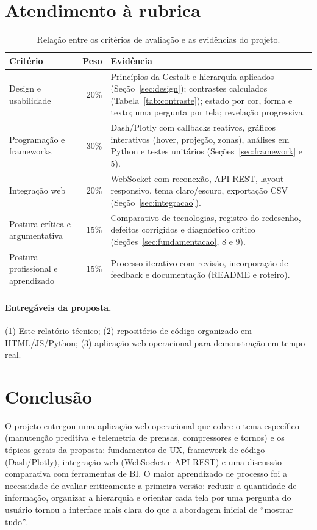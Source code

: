 \documentclass[12pt,a4paper]{article}
\begin{document}
\section{Atendimento à rubrica}
\begin{table}[H]
\centering
\caption{Relação entre os critérios de avaliação e as evidências do projeto.}
\label{tab:rubrica}
\small
\begin{tabularx}{\textwidth}{@{}l r X@{}}
\toprule
\textbf{Critério} & \textbf{Peso} & \textbf{Evidência}\\
\midrule
Design e usabilidade & 20\% & Princípios da Gestalt e hierarquia aplicados (Seção~\ref{sec:design}); contrastes calculados (Tabela~\ref{tab:contraste}); estado por cor, forma e texto; uma pergunta por tela; revelação progressiva.\\
Programação e frameworks & 30\% & Dash/Plotly com callbacks reativos, gráficos interativos (hover, projeção, zonas), análises em Python e testes unitários (Seções~\ref{sec:framework} e 5).\\
Integração web & 20\% & WebSocket com reconexão, API REST, layout responsivo, tema claro/escuro, exportação CSV (Seção~\ref{sec:integracao}).\\
Postura crítica e argumentativa & 15\% & Comparativo de tecnologias, registro do redesenho, defeitos corrigidos e diagnóstico crítico (Seções~\ref{sec:fundamentacao}, 8 e 9).\\
Postura profissional e aprendizado & 15\% & Processo iterativo com revisão, incorporação de feedback e documentação (README e roteiro).\\
\bottomrule
\end{tabularx}
\end{table}

\paragraph{Entregáveis da proposta.} (1) Este relatório técnico; (2) repositório de código organizado em HTML/JS/Python; (3) aplicação web operacional para
demonstração em tempo real.

\section{Conclusão}
O projeto entregou uma aplicação web operacional que cobre o tema específico (manutenção preditiva e telemetria de prensas, compressores e tornos) e os
tópicos gerais da proposta: fundamentos de UX, framework de código (Dash/Plotly), integração web (WebSocket e API REST) e uma discussão comparativa com ferramentas de BI.
O maior aprendizado de processo foi a necessidade de avaliar criticamente a primeira versão: reduzir a quantidade de informação, organizar a hierarquia e
orientar cada tela por uma pergunta do usuário tornou a interface mais clara do que a abordagem inicial de ``mostrar tudo''.
\end{document}
